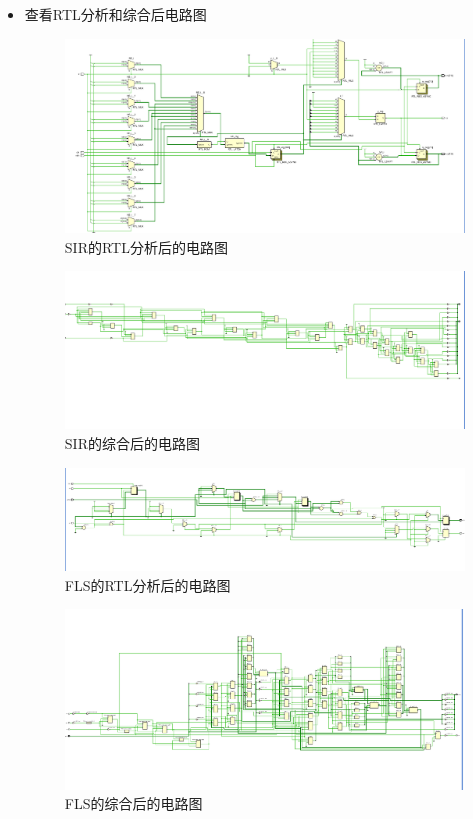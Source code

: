 \documentclass[UTF8,fontset=fandol]{ctexart}
\begin{document}
\begin{itemize}
    
    \item 查看RTL分析和综合后电路图
    \begin{figure}[H]
        \centering
        \includegraphics[scale=0.5]{Snipaste_2021-11-18_16-36-58.png}
        \caption{SIR的RTL分析后的电路图}
    \end{figure}
    \begin{figure}[H]
        \centering
        \includegraphics[scale=0.5]{Snipaste_2021-11-18_16-37-20.png}
        \caption{SIR的综合后的电路图}
    \end{figure}
    \begin{figure}[H]
        \centering
        \includegraphics[scale=0.5]{Snipaste_2021-11-18_16-35-05.png}
        \caption{FLS的RTL分析后的电路图}
    \end{figure}
    \begin{figure}[H]
        \centering
        \includegraphics[scale=0.5]{Snipaste_2021-11-18_16-35-49.png}
        \caption{FLS的综合后的电路图}
    \end{figure}
 

\end{itemize}
\end{document}
